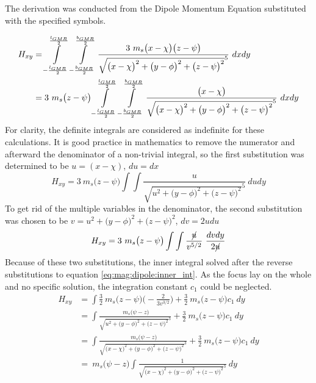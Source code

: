 The derivation was conducted from the Dipole Momentum Equation substituted with the specified symbols.

\begin{align}
H_{xy} &=  \int\displaylimits_{-\frac{l_{GMR}}{2}}^{\frac{l_{GMR}}{2}} \int\displaylimits_{-\frac{b_{GMR}}{2}}^{\frac{b_{GMR}}{2}} \frac{3\ m_s\big( x- \chi \big) \big(z- \psi\big) }{\sqrt{\big( x- \chi\big)^2 + \big(y- \phi\big)^2 + \big(z- \psi\big)^2}^5}\ dxdy
\label{eq:mag:dipole:double_int}\\
&=3\ m_s\big(z- \psi\big)  \int\displaylimits_{-\frac{l_{GMR}}{2}}^{\frac{l_{GMR}}{2}} \int\displaylimits_{-\frac{b_{GMR}}{2}}^{\frac{b_{GMR}}{2}} \frac{\big( x- \chi \big) }{\sqrt{\big( x- \chi\big)^2 + \big(y- \phi\big)^2 + \big(z- \psi\big)^2}^5}\ dxdy
\end{align}
For clarity, the definite integrals are considered as indefinite for these calculations. It is good practice in mathematics to remove the numerator and afterward the denominator of a non-trivial integral, so the first substitution was determined to be $u = (x-\chi)$, $du = dx$
\begin{equation}
H_{xy} =3\ m_s\big(z- \psi\big)  \int \int\frac{u}{\sqrt{u^2 + \big(y- \phi\big)^2 + \big(z- \psi\big)^2}^5}\ dudy
\end{equation}
To get rid of the multiple variables in the denominator, the  second substitution was chosen to be $v = u^2 + \big(y- \phi\big)^2 + \big(z- \psi\big)^2$, $dv = 2udu$
\begin{equation}
H_{xy} =3\ m_s\big(z- \psi\big)  \int \int\frac{\cancel{u}}{v^{5/2}}\ \frac{dvdy}{2\cancel{u}}
\end{equation}
\newpage
Because of these two substitutions, the inner integral solved after the reverse substitutions to equation \ref{eq:mag:dipole:inner_int}. As the focus lay on the whole and no specific solution, the integration constant $c_1$ could be neglected.
\begin{align}
H_{xy} &=\int\frac{3}{2}\ m_s\big(z- \psi\big)\big( -\frac{2}{3v^{3/2}}\big) + \frac{3}{2}\ m_s\big(z- \psi\big)c_1\ dy\\
&=  \int \frac{\ m_s\big(\psi-z\big) }{\sqrt{u^2 + \big(y- \phi\big)^2 + \big(z- \psi\big)^2}^3} + \frac{3}{2}\ m_s\big(z- \psi\big)c_1\ dy\\
&=  \int \frac{\ m_s\big(\psi-z\big) }{\sqrt{\big( x- \chi\big)^2 + \big(y- \phi\big)^2 + \big(z- \psi\big)^2}^3} + \frac{3}{2}\ m_s\big(z- \psi\big)c_1\ dy \label{eq:mag:dipole:inner_int}\\
&=\ m_s\big(\psi - z\big)  \int \frac{1}{\sqrt{\big( x- \chi\big)^2 + \big(y- \phi\big)^2 + \big(z- \psi\big)^2}^3}\ dy
\end{align}

